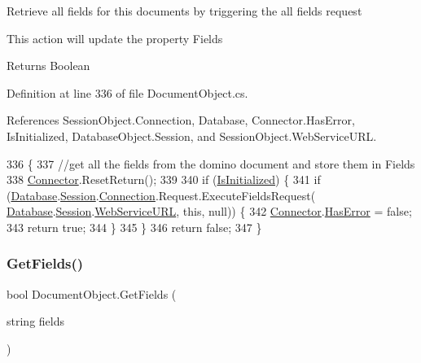 Retrieve all fields for this documents by triggering the all fields request 

This action will update the property \textquotesingle{}Fields\textquotesingle{} 

\begin{DoxyReturn}{Returns}
Boolean
\end{DoxyReturn}


Definition at line 336 of file Document\+Object.\+cs.



References Session\+Object.\+Connection, Database, Connector.\+Has\+Error, Is\+Initialized, Database\+Object.\+Session, and Session\+Object.\+Web\+Service\+U\+RL.


\begin{DoxyCode}
336                                \{
337         \textcolor{comment}{//get all the fields from the domino document and store them in Fields}
338         \mbox{\hyperlink{class_connector}{Connector}}.ResetReturn();
339 
340         \textcolor{keywordflow}{if} (\mbox{\hyperlink{class_document_object_a3b2075b73f38d05091b69decc6ce7992}{IsInitialized}}) \{
341             \textcolor{keywordflow}{if} (\mbox{\hyperlink{class_document_object_a69d5338c9835f748490323d2950eed09}{Database}}.\mbox{\hyperlink{class_database_object_aa8484162b7d2a7c4c9426bca13c64c07}{Session}}.\mbox{\hyperlink{class_session_object_a014bdbf705a753540e19bfb53030c55c}{Connection}}.Request.ExecuteFieldsRequest(
      \mbox{\hyperlink{class_document_object_a69d5338c9835f748490323d2950eed09}{Database}}.\mbox{\hyperlink{class_database_object_aa8484162b7d2a7c4c9426bca13c64c07}{Session}}.\mbox{\hyperlink{class_session_object_a697c071c812fbf7ad1166b896fb44c16}{WebServiceURL}}, \textcolor{keyword}{this}, null)) \{
342                 \mbox{\hyperlink{class_connector}{Connector}}.\mbox{\hyperlink{class_connector_a9365777a6b7b711b75bcfa6c4d53e989}{HasError}} = \textcolor{keyword}{false};
343                 \textcolor{keywordflow}{return} \textcolor{keyword}{true};
344             \}
345         \}
346         \textcolor{keywordflow}{return} \textcolor{keyword}{false};
347     \}
\end{DoxyCode}
\mbox{\label{class_document_object_a8883fec3b5b1b6e2e43f4b5ca4092684}} 
\subsubsection{\texorpdfstring{Get\+Fields()}{GetFields()}\hspace{0.1cm}{\footnotesize\ttfamily [1/2]}}
{\footnotesize\ttfamily bool Document\+Object.\+Get\+Fields (\begin{DoxyParamCaption}\item[{string}]{fields }\end{DoxyParamCaption})}



